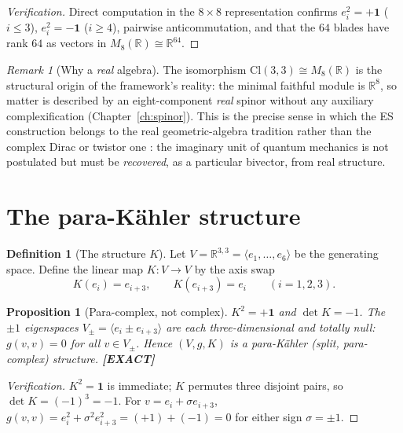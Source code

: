 \documentclass[11pt,oneside]{book}
\newcommand{\Cl}{\mathrm{Cl}}                     %
\newcommand{\RR}{\mathbb{R}}
\newcommand{\status}[1]{{\sffamily\bfseries\color{statuscol}[#1]}}
\theoremstyle{plain}
\newtheorem{proposition}[theorem]{Proposition}
\theoremstyle{definition}
\newtheorem{definition}[theorem]{Definition}
\theoremstyle{remark}
\newtheorem{remark}[theorem]{Remark}
\begin{document}
\begin{proof}[Verification]
Direct computation in the $8\times8$ representation confirms
$e_i^2=+\mathbf 1$ ($i\le3$), $e_i^2=-\mathbf 1$ ($i\ge4$), pairwise
anticommutation, and that the $64$ blades have rank $64$ as vectors in
$M_8(\RR)\cong\RR^{64}$.
\end{proof}

\begin{remark}[Why a \emph{real} algebra]
\label{rem:reality}
The isomorphism $\Cl(3,3)\cong M_8(\RR)$ is the structural origin of the
framework's reality: the minimal faithful module is $\RR^8$, so matter is
described by an eight-component \emph{real} spinor without any auxiliary
complexification (Chapter~\ref{ch:spinor}). This is the precise sense in which the
ES construction belongs to the real geometric-algebra tradition
\cite{Hestenes1966,DoranLasenby2003,Lounesto2001} rather than the complex Dirac or
twistor one \cite{Penrose1967}: the imaginary unit of quantum mechanics is not
postulated but must be \emph{recovered}, as a particular bivector, from real
structure.
\end{remark}

\section{The para-K\"ahler structure}
\label{sec:parakahler}

\begin{definition}[The structure $K$]
\label{def:K}
Let $V=\RR^{3,3}=\langle e_1,\dots,e_6\rangle$ be the generating space. Define the
linear map $K:V\to V$ by the axis swap
\[
  K(e_i)=e_{i+3},\qquad K(e_{i+3})=e_i\qquad(i=1,2,3).
\]
\end{definition}

\begin{proposition}[Para-complex, not complex]
\label{prop:K}
$K^2=+\mathbf 1$ and $\det K=-1$. The $\pm1$ eigenspaces
$V_\pm=\langle e_i\pm e_{i+3}\rangle$ are each three-dimensional and \emph{totally
null}: $g(v,v)=0$ for all $v\in V_\pm$. Hence $(V,g,K)$ is a para-K\"ahler
(split, para-complex) structure. \status{EXACT}
\end{proposition}

\begin{proof}[Verification]
$K^2=\mathbf 1$ is immediate; $K$ permutes three disjoint pairs, so
$\det K=(-1)^3=-1$. For $v=e_i+\sigma e_{i+3}$, $g(v,v)=e_i^2+\sigma^2e_{i+3}^2
=(+1)+(-1)=0$ for either sign $\sigma=\pm1$.
\end{proof}
\end{document}
